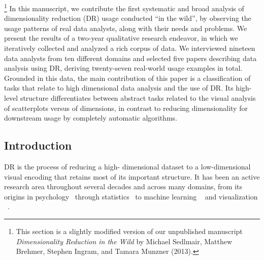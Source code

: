\footnote{This section is a slightly modified version of our unpublished manuscript {\it Dimensionality Reduction in the Wild} by Michael Sedlmair, Matthew Brehmer, Stephen Ingram, and Tamara Munzner (2013).} In this manuscript, we contribute the first systematic and broad analysis of dimensionality reduction (DR) usage conducted ``in the wild'', by observing the usage patterns of real data analysts, along with their needs and problems. 
We present the results of a two-year qualitative research endeavor, in which we iteratively collected and analyzed a rich corpus of data. 
We interviewed nineteen data analysts from ten different domains and selected five papers describing data analysis using \ac{DR}, deriving twenty-seven real-world usage examples in total.
Grounded in this data, the main contribution of this paper is a classification of tasks that relate to high dimensional data analysis and the use of \ac{DR}. 
Its high-level structure differentiates between abstract tasks related to the visual analysis of scatterplots versus of dimensions, in contrast to reducing dimensionality for downstream usage by completely automatic algorithms. 

\subsection{Introduction}
\label{app:drvistasks:dritw:introduction}


\begin{sloppypar}
\ac{DR} is the process of reducing a high- dimensional dataset to a low-dimensional visual encoding that retains most of its important structure. 
It has been an active research area throughout several decades and across many domains, from its origins in psychology~\cite{Torgerson1952,Young1938} through statistics~\cite{Buja2002} to machine learning
~\cite{Belkin2001,Guyon2003,Jain2000,Tenenbaum2000,VanderMaaten2008} and visualization
~\cite{Ingram2009,Johansson2009,Yang2003}.
\end{sloppypar}


